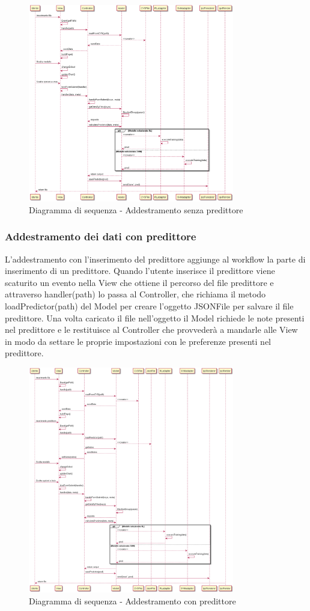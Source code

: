 \documentclass[../manuale-sviluppatore.tex]{subfiles}
\begin{document}
\begin{figure}[h]
    \begin{center}
         \includegraphics[width=9cm]{img/sequenceDiagramNoP.png}
         \caption{Diagramma di sequenza - Addestramento senza predittore}
         \label{fig:diagramma_di_sequenza}
     \end{center}
 \end{figure}

\subsubsection{Addestramento dei dati con predittore}
\label{ssec:addestramento_dati_con_predittore}
L'addestramento con l'inserimento del predittore aggiunge al workflow la parte di inserimento di un predittore.
Quando l'utente inserisce il predittore viene scaturito un evento nella View che ottiene il percorso del file predittore e attraverso handler(path) lo passa al Controller,
che richiama il metodo loadPredictor(path) del Model per creare l'oggetto JSONFile per salvare il file predittore.
Una volta caricato il file nell'oggetto il Model richiede le note presenti nel predittore e le restituisce al Controller che provvederà a mandarle alle View in modo da settare le proprie impostazioni con le preferenze presenti nel predittore.

\begin{figure}[h]
    \begin{center}
         \includegraphics[width=9cm]{img/sequenceDiagramConP.png}
         \caption{Diagramma di sequenza - Addestramento con predittore}
         \label{fig:daa}
     \end{center}
 \end{figure}
 
\end{document}
